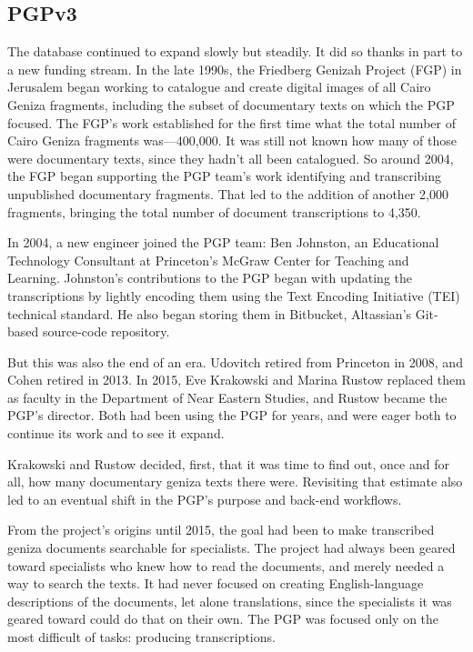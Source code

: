 \documentclass{article}
\begin{document}
\subsection{PGPv3}

The database continued to expand slowly but steadily. It did so thanks in part to a new funding stream. In the late 1990s, the Friedberg Genizah Project (FGP) in Jerusalem began working to catalogue and create digital images of all Cairo Geniza fragments, including the subset of documentary texts on which the PGP focused. The FGP’s work established for the first time what the total number of Cairo Geniza fragments was—400,000. It was still not known how many of those were documentary texts, since they hadn’t all been catalogued. So around 2004, the FGP began supporting the PGP team’s work identifying and transcribing unpublished documentary fragments. That led to the addition of another 2,000 fragments, bringing the total number of document transcriptions to 4,350.

In 2004, a new engineer joined the PGP team: Ben Johnston, an Educational Technology Consultant at Princeton’s McGraw Center for Teaching and Learning. Johnston’s contributions to the PGP began with updating the transcriptions by lightly encoding them using the Text Encoding Initiative (TEI) technical standard. He also began storing them in Bitbucket, Altassian’s Git-based source-code repository. 

But this was also the end of an era. Udovitch retired from Princeton in 2008, and Cohen retired in 2013. In 2015, Eve Krakowski and Marina Rustow replaced them as faculty in the Department of Near Eastern Studies, and Rustow became the PGP’s director. Both had been using the PGP for years, and were eager both to continue its work and to see it expand. 

Krakowski and Rustow decided, first, that it was time to find out, once and for all, how many documentary geniza texts there were. Revisiting that estimate also led to an eventual shift in the PGP’s purpose and back-end workflows. 

From the project’s origins until 2015, the goal had been to make transcribed geniza documents searchable for specialists. The project had always been geared toward specialists who knew how to read the documents, and merely needed a way to search the texts. It had never focused on creating English-language descriptions of the documents, let alone translations, since the specialists it was geared toward could do that on their own. The PGP was focused only on the most difficult of tasks: producing transcriptions. 
\end{document}
